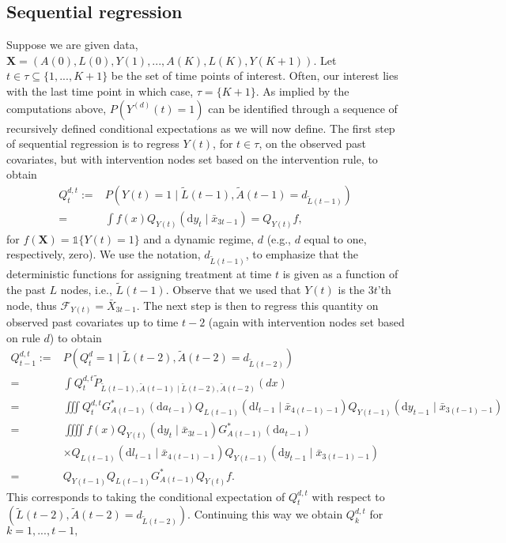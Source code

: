 \documentclass{article}
\newcommand{\A}[1]{A(#1)}
\renewcommand{\L}[1]{L(#1)}
\newcommand{\Y}[1]{Y(#1)}
\newcommand{\Ystar}[2]{Y^{(#1)}(#2)}
\newcommand{\Lbar}[1]{\tilde{L}(#1)}
\newcommand{\Abar}[1]{\tilde{A}(#1)}
\renewcommand{\d}{\ensuremath{\mathrm{d}}}
\begin{document}
    \subsection{Sequential regression}
    Suppose we are given data, $\textbf{X}=(\A{0},\L{0},\Y{1},...,\A{K},\L{K},\Y{K+1})$. Let $t\in\tau\subseteq\{1,...,K+1\}$ be the set of time points of interest. Often, our interest lies with the last time point in which case, $\tau=\{K+1\}$. As implied by the computations above, $P(\Ystar{d}{t}=1)$ can be identified through a sequence of recursively defined conditional expectations as we will now define. The first step of sequential regression is to regress $\Y{t}$, for $t\in\tau$, on the observed past covariates, but with intervention nodes set based on the intervention rule, to obtain 
    \begin{align*}
        Q_t^{d,t}:=&P(\Y{t}=1\mid \Lbar{t-1},\Abar{t-1}=d_{\Lbar{t-1}})\\
        =&\int f(x)Q_{\Y{t}}(\d y_t\mid \bar{x}_{3t-1})=Q_{\Y{t}}f,\tag{Step 1}
    \end{align*} 
    for $f(\textbf{X})=\mathds{1}\{\Y{t}=1\}$ and a dynamic regime, $d$ (e.g., $d$ equal to one, respectively, zero). We use the notation, $d_{\Lbar{t-1}}$, to emphasize that the deterministic functions for assigning treatment at time $t$ is given as a function of the past $L$ nodes, i.e., $\Lbar{t-1}$. Observe that we used that $Y(t)$ is the $3t$'th node, thus $\mathcal{F}_{\Y{t}}=\bar{X}_{3t-1}$. The next step is then to regress this quantity on observed past covariates up to time $t-2$ (again with intervention nodes set based on rule $d$) to obtain
    \begin{align*}
        Q_{t-1}^{d,t}:=&P(Q_{t}^d=1\mid \Lbar{t-2},\Abar{t-2}=d_{\Lbar{t-2}})\\
        =&\int Q_t^{d,t}\tilde{P}_{\Lbar{t-1},\Abar{t-1}\mid \Lbar{t-2},\Abar{t-2}}(dx)\\
        =&\iiint Q_t^{d,t}G^*_{\A{t-1}}(\d a_{t-1})Q_{\L{t-1}}(\d l_{t-1}\mid \bar{x}_{4(t-1)-1})Q_{\Y{t-1}}(\d y_{t-1}\mid \bar{x}_{3(t-1)-1})\\
        =&\iiiint f(x) Q_{\Y{t}}(\d y_t\mid \bar{x}_{3t-1})G^*_{\A{t-1}}(\d a_{t-1})\\
        &\times Q_{\L{t-1}}(\d l_{t-1}\mid \bar{x}_{4(t-1)-1})Q_{\Y{t-1}}(\d y_{t-1}\mid \bar{x}_{3(t-1)-1})\\
        =&Q_{\Y{t-1}}Q_{\L{t-1}}G^*_{\A{t-1}}Q_{\Y{t}}f.\tag{Step 2}
    \end{align*}
    This corresponds to taking the conditional expectation of $Q_t^{d,t}$ with respect to $(\Lbar{t-2},\Abar{t-2}=d_{\Lbar{t-2}})$. Continuing this way we obtain $Q_k^{d,t}$ for $k=1,...,t-1,$
\end{document}
